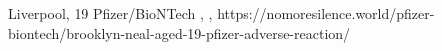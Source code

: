           {Liverpool, }
          {19}
          {Pfizer/BioNTech}
          {}
          {
            ,
            ,
          }
          {https://nomoresilence.world/pfizer-biontech/brooklyn-neal-aged-19-pfizer-adverse-reaction/}
